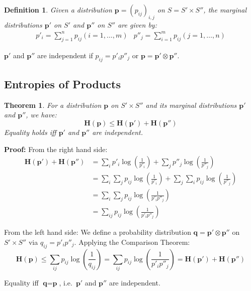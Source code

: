 \documentclass[11pt]{article}
\newtheorem{defn}{Definition}
\newtheorem{theo}{Theorem}
\begin{document}
\begin{defn}
  Given a distribution $\textbf{p} = (p_{ij})_{i, j}$ on $S = S' \times S''$, the marginal distributions $\textbf{p}'$ on $S'$ and $\textbf{p}''$ on $S''$ are given by:
  \begin{align*}
    p'_i = \sum_{j = 1}^n p_{ij} (i = 1, \ldots, m) & p''_j = \sum_{i = 1}^m p_{ij} (j = 1, \ldots, n)
  \end{align*}
\end{defn}

$\textbf{p}'$ and $\textbf{p}''$ are independent if $p_{ij} = p'_i p''_j$ or $\textbf{p} = \textbf{p}' \otimes \textbf{p}''$.

\subsection{Entropies of Products}
\begin{theo}
  For a distribution $\textbf{p}$ on $S' \times S''$ and its marginal distributions $\textbf{p}'$ and $\textbf{p}''$, we have:
  \[
    \textbf{H}(\textbf{p}) \leq \textbf{H}(\textbf{p}') + \textbf{H}(\textbf{p}'')
  \]
  Equality holds iff $\textbf{p}'$ and $\textbf{p}''$ are independent.
\end{theo}

\textbf{Proof:}
From the right hand side:
\begin{align*}
  \textbf{H}(\textbf{p}') + \textbf{H}(\textbf{p}'') &= \sum_i p'_i \log(\frac{1}{p'_i}) + \sum_j p''_j \log(\frac{1}{p''_j}) \\
  &= \sum_i \sum_j p_{ij} \log(\frac{1}{p'_i}) + \sum_j \sum_i p_{ij} \log(\frac{1}{p''_j}) \\
  &= \sum_i \sum_j p_{ij} \log(\frac{1}{p'_ip''_j}) \\
  &= \sum_{ij} p_{ij} \log(\frac{1}{p'_ip''_j})
\end{align*}

From the left hand side:
We define a probability distribution $\textbf{q} = \textbf{p}' \otimes \textbf{p}''$ on $S' \times S''$ via $q_{ij} = p'_ip''_j$.
Applying the Comparison Theorem:
\[
  \textbf{H}(\textbf{p}) \leq \sum_{ij} p_{ij} \log(\frac{1}{q_{ij}}) = \sum_{ij} p_{ij} \log(\frac{1}{p'_ip''_j}) = \textbf{H}(\textbf{p}') + \textbf{H}(\textbf{p}'')
\]

Equality iff $\textbf{q} = \textbf{p}$, i.e.\ $\textbf{p}'$ and $\textbf{p}''$ are independent.
\end{document}
